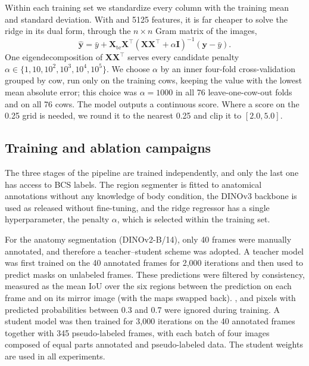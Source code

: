 Within each training set we standardize every column with the training mean and standard deviation.
With  and 5125 features, it is far cheaper to solve the ridge in its dual form, through the $n\times n$ Gram matrix of the images,
\begin{equation}
  \hat{\mathbf{y}} = \bar{y} + \mathbf{X}_{\text{te}} \mathbf{X}^{\top} \left( \mathbf{X}\mathbf{X}^{\top} + \alpha \mathbf{I} \right)^{-1} (\mathbf{y} - \bar{y}) .
  \label{eq:ridge}
\end{equation}
One eigendecomposition of $\mathbf{X}\mathbf{X}^{\top}$ serves every candidate penalty $\alpha \in \{1, 10, 10^2, 10^3, 10^4, 10^5\}$.
We choose $\alpha$ by an inner four-fold cross-validation grouped by cow, run only on the training cows, keeping the value with the lowest mean absolute error; this choice was $\alpha = 1000$ in all 76 leave-one-cow-out folds and on all 76 cows.
The model outputs a continuous score.
Where a score on the 0.25 grid is needed, we round it to the nearest 0.25 and clip it to $[2.0, 5.0]$.

\subsection{Training and ablation campaigns}
\label{sec:training}

The three stages of the pipeline are trained independently, and only the last one has access to BCS labels.
The region segmenter is fitted to anatomical annotations without any knowledge of body condition, the DINOv3 backbone is used as released without fine-tuning, and the ridge regressor has a single hyperparameter, the penalty $\alpha$, which is selected within the training set.

For the anatomy segmentation (DINOv2-B/14), only 40 frames were manually annotated, and therefore a teacher--student scheme was adopted.
A teacher model was first trained on the 40 annotated frames for 2,000 iterations and then used to predict masks on unlabeled frames.
These predictions were filtered by consistency, measured as the mean IoU over the six regions between the prediction on each frame and on its mirror image (with the  maps swapped back).
, and pixels with predicted probabilities between 0.3 and 0.7 were ignored during training.
A student model was then trained for 3,000 iterations on the 40 annotated frames together with 345 pseudo-labeled frames, with each batch of four images composed of equal parts annotated and pseudo-labeled data.
The student weights are used in all experiments.

